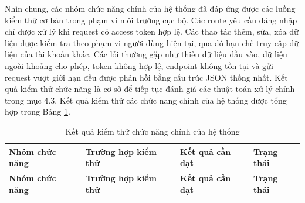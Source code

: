\documentclass[12pt, a4paper]{report}
\begin{document}
Nhìn chung, các nhóm chức năng chính của hệ thống đã đáp ứng được các luồng kiểm thử cơ bản trong phạm vi môi trường cục bộ. Các route yêu cầu đăng nhập chỉ được xử lý khi request có access token hợp lệ. Các thao tác thêm, sửa, xóa dữ liệu được kiểm tra theo phạm vi người dùng hiện tại, qua đó hạn chế truy cập dữ liệu của tài khoản khác. Các lỗi thường gặp như thiếu dữ liệu đầu vào, dữ liệu ngoài khoảng cho phép, token không hợp lệ, endpoint không tồn tại và gửi request vượt giới hạn đều được phản hồi bằng cấu trúc JSON thống nhất. Kết quả kiểm thử chức năng là cơ sở để tiếp tục đánh giá các thuật toán xử lý chính trong mục 4.3. Kết quả kiểm thử các chức năng chính của hệ thống được tổng hợp trong Bảng \ref{tab:kq_kiem_thu_chuc_nang}.

\begin{longtable}{|>{\raggedright\arraybackslash}p{3cm}|>{\raggedright\arraybackslash}p{3cm}|>{\raggedright\arraybackslash}p{4cm}|>{\raggedright\arraybackslash}p{5cm}|}
\caption{Kết quả kiểm thử chức năng chính của hệ thống}
\label{tab:kq_kiem_thu_chuc_nang} \\
\hline
\textbf{Nhóm chức năng} & \textbf{Trường hợp kiểm thử} & \textbf{Kết quả cần đạt} & \textbf{Trạng thái} \\
\hline
\endfirsthead
\hline
\textbf{Nhóm chức năng} & \textbf{Trường hợp kiểm thử} & \textbf{Kết quả cần đạt} & \textbf{Trạng thái} \\
\hline
\endhead


\end{longtable}
\end{document}
